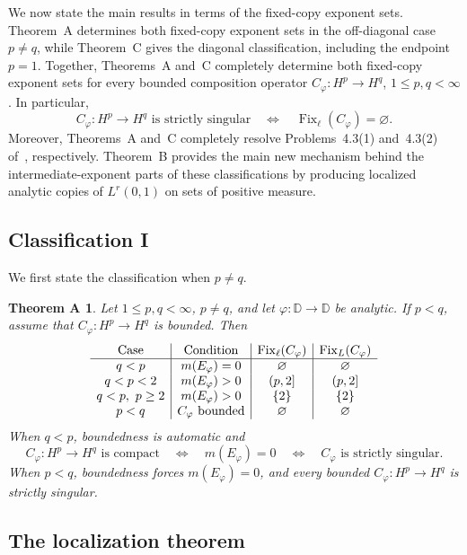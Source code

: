 \documentclass[11pt, reqno]{amsart}
\newtheorem*{theoremA}{Theorem A}
\theoremstyle{definition}
\theoremstyle{remark}
\newcommand{\D}{\mathbb{D}}
\begin{document}
We now state the main results in terms of the fixed-copy exponent sets.
Theorem~A determines both fixed-copy exponent sets in the
off-diagonal case \(p\ne q\), while Theorem~C gives the diagonal
classification, including the endpoint \(p=1\). Together,
Theorems~A and~C completely determine both fixed-copy exponent sets
for every bounded composition operator
\(C_\varphi:H^p\to H^q\), \(1\le p,q<\infty\). In particular,
\[
        C_\varphi:H^p\to H^q
        \text{ is strictly singular}
        \quad\Longleftrightarrow\quad
        \operatorname{Fix}_{\ell}(C_\varphi)=\varnothing.
\]
Moreover, Theorems~A and~C completely resolve
Problems~4.3\textup{(1)} and~4.3\textup{(2)}
of~\cite{LNST2017}, respectively.
Theorem~B provides the main new mechanism behind the
intermediate-exponent parts of these classifications by producing
localized analytic copies of \(L^r(0,1)\) on sets of positive measure.

\subsection*{Classification I}  We first state the classification when \(p\ne q\).

\begin{theoremA}
Let \(1\le p,q<\infty\),  \(p\ne q\), and let \(\varphi:\D\to\D\) be analytic.  If \(p<q\), assume that
\(C_\varphi:H^p\to H^q\) is bounded.  Then
\[
\begin{array}{c|c|c|c}
\textup{Case}
& \textup{Condition}
& \operatorname{Fix}_{\ell}(C_\varphi)
& \operatorname{Fix}_{L}(C_\varphi)\\
\hline
q<p
& m(E_\varphi)=0
& \varnothing
& \varnothing\\
q<p<2
& m(E_\varphi)>0
& (p,2]
& (p,2]\\
q<p,\ p\ge2
& m(E_\varphi)>0
& \{2\}
& \{2\}\\
p<q
& C_\varphi\textup{ bounded}
& \varnothing
& \varnothing
\end{array}
\]
When \(q<p\), boundedness is automatic and
\[
C_\varphi:H^p\to H^q\text{ is compact}
\quad\Longleftrightarrow\quad
m(E_\varphi)=0
\quad\Longleftrightarrow\quad
C_\varphi\text{ is strictly singular}.
\]
When \(p<q\), boundedness forces \(m(E_\varphi)=0\), and every
bounded \(C_\varphi:H^p\to H^q\) is strictly singular.
\end{theoremA}
 

\subsection*{The localization theorem}
\end{document}
